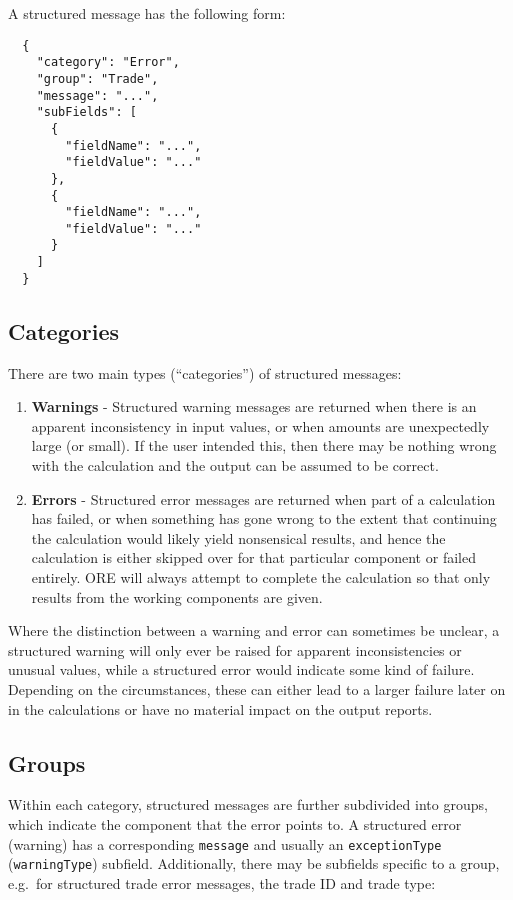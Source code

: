 A structured message has the following form:

\begin{verbatim}
  {
    "category": "Error",
    "group": "Trade",
    "message": "...",
    "subFields": [
      {
        "fieldName": "...",
        "fieldValue": "..."
      },
      {
        "fieldName": "...",
        "fieldValue": "..."
      }
    ]
  }
\end{verbatim}


\subsection{Categories}

There are two main types (``categories'') of structured messages:
\begin{enumerate}
  \item \textbf{Warnings} - Structured warning messages are returned when there is an apparent inconsistency in input values, or when
  amounts are unexpectedly large (or small). If the user intended this, then there may be nothing wrong with the calculation and the
  output can be assumed to be correct.
  \item \textbf{Errors} - Structured error messages are returned when part of a calculation has failed, or when something has gone
  wrong to the extent that continuing the calculation would likely yield nonsensical results, and hence the calculation is either skipped
  over for that particular component or failed entirely. ORE will always attempt to complete the calculation so that only results from the
  working components are given.
\end{enumerate}
Where the distinction between a warning and error can sometimes be unclear, a structured warning will only ever be raised for apparent
inconsistencies or unusual values, while a structured error would indicate some kind of failure. Depending on the circumstances,
these can either lead to a larger failure later on in the calculations or have no material impact on the output reports.


\subsection{Groups}

Within each category, structured messages are further subdivided into groups, which indicate the component that the error points to.
A structured error (warning) has a corresponding \lstinline!message! and usually an \lstinline!exceptionType! (\lstinline!warningType!)
subfield. Additionally, there may be subfields specific to a group, e.g.\ for structured trade error messages, the trade ID and trade
type:

